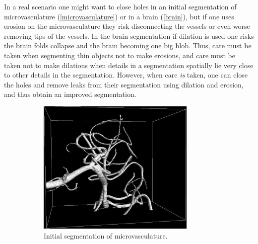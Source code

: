 In a real scenario one might want to close holes in an initial segmentation of microvasculature (\autoref{microvasculature}) or in a brain (\autoref{brain}), but if one uses erosion on the microvasculature they risk disconnecting the vessels or even worse removing tips of the vessels. In the brain segmentation if dilation is used one risks the brain folds collapse and the brain becoming one big blob. Thus, care must be taken when segmenting thin objects not to make erosions, and care must be taken not to make dilations when details in a segmentation spatially lie very close to other details in the segmentation. However, when care \textit{is} taken, one can close the holes and remove leaks from their segmentation using dilation and erosion, and thus obtain an improved segmentation.

\begin{figure}[h]
	\centering
	\begin{subfigure}{0.3\linewidth}
		\centering
		\includegraphics[width=\linewidth]{Materials/microvasculature}
		\caption{Initial segmentation of microvasculature.}
		\label{microvasculature}
	\end{subfigure}
	\hspace{1cm}
	\begin{subfigure}{0.3\linewidth}
		\centering

\end{subfigure}
\end{figure}
